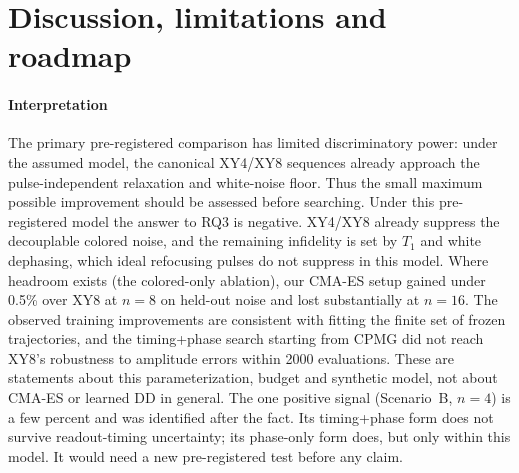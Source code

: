 \section{Discussion, limitations and roadmap}
\label{sec:discussion}

\paragraph{Interpretation} The primary pre-registered comparison has limited discriminatory power: under the
assumed model, the canonical XY4/XY8 sequences already approach the
pulse-independent relaxation and white-noise floor. Thus the small maximum
possible improvement should be assessed before searching. Under this
pre-registered model the answer to RQ3 is negative. XY4/XY8
already suppress the decouplable colored noise, and the remaining infidelity is set by $T_1$
and white dephasing, which ideal refocusing pulses do not suppress in this model. Where headroom exists (the
colored-only ablation), our CMA-ES setup gained under 0.5\% over XY8 at $n=8$ on held-out noise
and lost substantially at $n=16$. The observed training improvements are consistent with fitting the finite set of frozen trajectories, and the timing+phase
search starting from CPMG did not reach XY8's robustness to amplitude errors within 2000
evaluations. These are statements about this parameterization, budget and synthetic model, not
about CMA-ES or learned DD in general. The one positive signal (Scenario~B, $n=4$) is a few
percent and was identified after the fact. Its timing+phase form does not survive
readout-timing uncertainty; its phase-only form does, but only within this model. It would need
a new pre-registered test before any claim.

